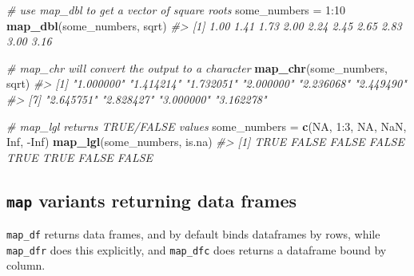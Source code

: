 \documentclass[]{book}
\newenvironment{Shaded}{}{}
\newcommand{\CommentTok}[1]{\textcolor[rgb]{0.38,0.63,0.69}{\textit{#1}}}
\newcommand{\DataTypeTok}[1]{\textcolor[rgb]{0.56,0.13,0.00}{#1}}
\newcommand{\DecValTok}[1]{\textcolor[rgb]{0.25,0.63,0.44}{#1}}
\newcommand{\KeywordTok}[1]{\textcolor[rgb]{0.00,0.44,0.13}{\textbf{#1}}}
\newcommand{\NormalTok}[1]{#1}
\newcommand{\OperatorTok}[1]{\textcolor[rgb]{0.40,0.40,0.40}{#1}}
\newcommand{\OtherTok}[1]{\textcolor[rgb]{0.00,0.44,0.13}{#1}}
\newcommand{\StringTok}[1]{\textcolor[rgb]{0.25,0.44,0.63}{#1}}
\begin{document}
\begin{Shaded}
\begin{Highlighting}[]
\CommentTok{# use map_dbl to get a vector of square roots}
\NormalTok{some_numbers =}\StringTok{ }\DecValTok{1}\OperatorTok{:}\DecValTok{10}
\KeywordTok{map_dbl}\NormalTok{(some_numbers, sqrt)}
\CommentTok{#>  [1] 1.00 1.41 1.73 2.00 2.24 2.45 2.65 2.83 3.00 3.16}

\CommentTok{# map_chr will convert the output to a character}
\KeywordTok{map_chr}\NormalTok{(some_numbers, sqrt)}
\CommentTok{#>  [1] "1.000000" "1.414214" "1.732051" "2.000000" "2.236068" "2.449490"}
\CommentTok{#>  [7] "2.645751" "2.828427" "3.000000" "3.162278"}

\CommentTok{# map_lgl returns TRUE/FALSE values}
\NormalTok{some_numbers =}\StringTok{ }\KeywordTok{c}\NormalTok{(}\OtherTok{NA}\NormalTok{, }\DecValTok{1}\OperatorTok{:}\DecValTok{3}\NormalTok{, }\OtherTok{NA}\NormalTok{, }\OtherTok{NaN}\NormalTok{, }\OtherTok{Inf}\NormalTok{, }\OperatorTok{-}\OtherTok{Inf}\NormalTok{)}
\KeywordTok{map_lgl}\NormalTok{(some_numbers, is.na)}
\CommentTok{#> [1]  TRUE FALSE FALSE FALSE  TRUE  TRUE FALSE FALSE}
\end{Highlighting}
\end{Shaded}

\hypertarget{map-variants-returning-data-frames}{%
\subsection{\texorpdfstring{\texttt{map} variants returning data frames}{map variants returning data frames}}\label{map-variants-returning-data-frames}}

\texttt{map\_df} returns data frames, and by default binds dataframes by rows, while \texttt{map\_dfr} does this explicitly, and \texttt{map\_dfc} does returns a dataframe bound by column.

\begin{Shaded}
\end{Shaded}
\end{document}
